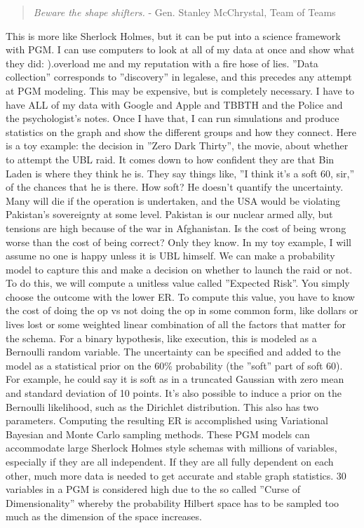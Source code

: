 \documentclass{article}
\begin{document}
\begin{multicols}{2}
\begin{quote}
\emph{Beware the shape shifters.}
  - Gen. Stanley McChrystal, Team of Teams \cite{teamofteams}
\end{quote}

This is more like Sherlock Holmes, but it can be put into a science framework with PGM. I can use computers to look at all of my data at once and show what they did: ).overload me and my reputation with a fire hose of lies. ''Data collection'' corresponds to ''discovery'' in legalese, and this precedes any attempt at PGM modeling. This may be expensive, but is completely necessary. I have to have ALL of my data with Google and Apple and TBBTH and the Police and the psychologist's notes. Once I have that, I can run simulations and produce statistics on the graph and show the different groups and how they connect. Here is a toy example: the decision in ''Zero Dark Thirty'', the movie, about whether to attempt the UBL raid. It comes down to how confident they are that Bin Laden is where they think he is. They say things like, ''I think it's a soft 60, sir,'' of the chances that he is there. How soft? He doesn't quantify the uncertainty. Many will die if the operation is undertaken, and the USA would be violating Pakistan's sovereignty at some level. Pakistan is our nuclear armed ally, but tensions are high because of the war in Afghanistan. Is the cost of being wrong worse than the cost of being correct? Only they know. In my toy example, I will assume no one is happy unless it is UBL himself. We can make a probability model to capture this and make a decision on whether to launch the raid or not. To do this, we will compute a unitless value called ''Expected Risk''. You simply choose the outcome with the lower ER. To compute this value, you have to know the cost of doing the op vs not doing the op in some common form, like dollars or lives lost or some weighted linear combination of all the factors that matter for the schema. For a binary hypothesis, like execution, this is modeled as a Bernoulli random variable. The uncertainty can be specified and added to the model as a statistical prior on the 60\% probability (the ''soft'' part of soft 60). For example, he could say it is soft as in a truncated Gaussian with zero mean and standard deviation of 10 points. It's also possible to induce a prior on the Bernoulli likelihood, such as the Dirichlet distribution. This also has two parameters. Computing the resulting ER is accomplished using Variational Bayesian \cite{variational} and Monte Carlo sampling \cite{mcmc} methods. These PGM models can accommodate large Sherlock Holmes style schemas with millions of variables, especially if they are all independent. If they are all fully dependent on each other, much more data is needed to get accurate and stable graph statistics. 30 variables in a PGM is considered high due to the so called ''Curse of Dimensionality'' whereby the probability Hilbert space has to be sampled too much as the dimension of the space increases.


\end{multicols}
\end{document}
